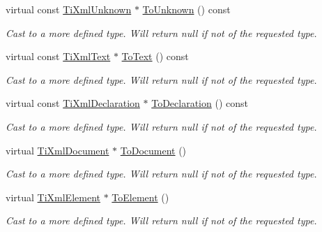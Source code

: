 \begin{DoxyCompactItemize}
virtual const \hyperlink{class_ti_xml_unknown}{Ti\+Xml\+Unknown} $\ast$ \hyperlink{class_ti_xml_node_ab4f2e6ce87d36c1b9b7de2529128a460}{To\+Unknown} () const
\begin{DoxyCompactList}\small\item\em Cast to a more defined type. Will return null if not of the requested type. \end{DoxyCompactList}\item 
\hypertarget{class_ti_xml_node_a2591700660b308571c09166559a39332}{}\label{class_ti_xml_node_a2591700660b308571c09166559a39332} 
virtual const \hyperlink{class_ti_xml_text}{Ti\+Xml\+Text} $\ast$ \hyperlink{class_ti_xml_node_a2591700660b308571c09166559a39332}{To\+Text} () const
\begin{DoxyCompactList}\small\item\em Cast to a more defined type. Will return null if not of the requested type. \end{DoxyCompactList}\item 
\hypertarget{class_ti_xml_node_a0dc0831e89d499ca911a3be61a413d45}{}\label{class_ti_xml_node_a0dc0831e89d499ca911a3be61a413d45} 
virtual const \hyperlink{class_ti_xml_declaration}{Ti\+Xml\+Declaration} $\ast$ \hyperlink{class_ti_xml_node_a0dc0831e89d499ca911a3be61a413d45}{To\+Declaration} () const
\begin{DoxyCompactList}\small\item\em Cast to a more defined type. Will return null if not of the requested type. \end{DoxyCompactList}\item 
\hypertarget{class_ti_xml_node_a6a4c8ac28ee7a745d059db6691e03bae}{}\label{class_ti_xml_node_a6a4c8ac28ee7a745d059db6691e03bae} 
virtual \hyperlink{class_ti_xml_document}{Ti\+Xml\+Document} $\ast$ \hyperlink{class_ti_xml_node_a6a4c8ac28ee7a745d059db6691e03bae}{To\+Document} ()
\begin{DoxyCompactList}\small\item\em Cast to a more defined type. Will return null if not of the requested type. \end{DoxyCompactList}\item 
\hypertarget{class_ti_xml_node_aa65d000223187d22a4dcebd7479e9ebc}{}\label{class_ti_xml_node_aa65d000223187d22a4dcebd7479e9ebc} 
virtual \hyperlink{class_ti_xml_element}{Ti\+Xml\+Element} $\ast$ \hyperlink{class_ti_xml_node_aa65d000223187d22a4dcebd7479e9ebc}{To\+Element} ()
\begin{DoxyCompactList}\small\item\em Cast to a more defined type. Will return null if not of the requested type. \end{DoxyCompactList}\item 

\end{DoxyCompactItemize}
